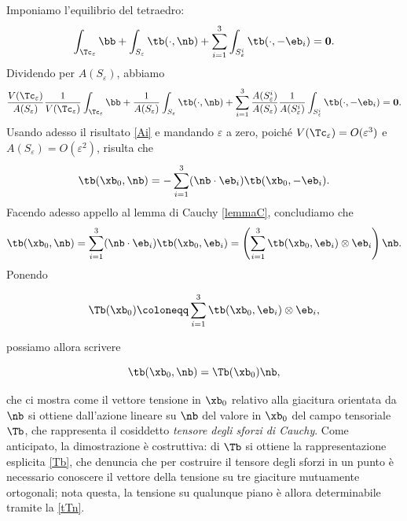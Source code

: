 Imponiamo l'equilibrio del tetraedro:
\begin{equation}
\int_{\Tc_\varepsilon}\bb+ \int_{S_\varepsilon}\tb(\cdot, \nb)+\sum_{i=1}^{3}\int_{S_\varepsilon^i}\tb( \cdot, -\eb_i)=\mathbf{0}.
\end{equation}
Dividendo per $A(S_\varepsilon)$, abbiamo
\begin{equation}
\frac{V(\Tc_\varepsilon)}{A(S_\varepsilon)} \frac{1}{V(\Tc_\varepsilon)}	\int_{\Tc_\varepsilon}\bb+ \frac{1}{A(S_\varepsilon)} \int_{S_\varepsilon}\tb(\cdot, \nb)+\sum_{i=1}^{3}\frac{A(S^i_\varepsilon)}{A(S_\varepsilon)}\frac{1}{A(S^i_\varepsilon)}\int_{S_\varepsilon^i}\tb( \cdot, -\eb_i)=\mathbf{0}.
\end{equation}
Usando adesso il risultato \eqref{Ai} e mandando $\varepsilon$ a zero, poiché $V(\Tc_\varepsilon)=O(\varepsilon^3)$ e $A(S_\varepsilon)=O(\varepsilon^2)$, risulta che
\begin{equation}
\tb(\xb_0,\nb)=-\sum_{i=1}^{3}(\nb\cdot\eb_i)\tb(\xb_0, -\eb_i).
\end{equation}
Facendo adesso appello al lemma di Cauchy \eqref{lemmaC}, concludiamo che 
\begin{equation}
	\tb(\xb_0,\nb)=\sum_{i=1}^{3}(\nb\cdot\eb_i)\tb(\xb_0, \eb_i)=\left(\sum_{i=1}^{3}\tb(\xb_0, \eb_i)\otimes\eb_i\right) \nb.
\end{equation}
Ponendo
\begin{definition}
	\begin{equation}\label{Tb}
\Tb(\xb_0)\coloneqq \sum_{i=1}^{3}\tb(\xb_0, \eb_i)\otimes\eb_i,
\end{equation}
\end{definition}
possiamo allora scrivere
\begin{definition}
\begin{equation}\label{tTn}
\tb(\xb_0,\nb)= \Tb(\xb_0)\nb,
\end{equation}
\end{definition}
che ci mostra come il vettore tensione in $\xb_0$ relativo alla giacitura orientata da $\nb$ si ottiene dall'azione lineare su $\nb$ del valore in $\xb_0$ del campo tensoriale  $\Tb$, che rappresenta il cosiddetto \textit{tensore degli sforzi di Cauchy}. Come anticipato, la dimostrazione è costruttiva: di $\Tb$ si ottiene la rappresentazione esplicita \eqref{Tb}, che denuncia che per costruire il tensore degli sforzi in un punto è necessario conoscere il vettore della tensione su tre giaciture mutuamente ortogonali; nota questa, la tensione su qualunque piano è allora determinabile tramite la \eqref{tTn}.


